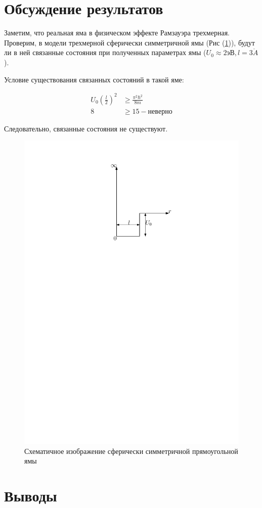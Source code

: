\documentclass[a4paper,12pt]{article}
\begin{document}
\section*{Обсуждение результатов}

Заметим, что реальная яма в физическом эффекте Рамзауэра трехмерная. Проверим, в модели трехмерной сферически симметричной ямы (Рис (\ref{fig4:potential_well_shere})), будут ли в ней связанные состояния при полученных параметрах ямы ($U_0 \approx 2 эВ, l = 3 \mathring{A}$).

Условие существования связанных состояний в такой яме:

\begin{align*}
	U_0 \left( \frac{l}{2} \right)^2 &\geqslant \frac{\pi^2 \hbar^2}{8 m} \\
	8 &\geqslant 15 - неверно
\end{align*}

Следовательно, связанные состояния не существуют.   

\begin{figure}[h!]
	\centering
	\includegraphics[width=0.5\linewidth]{fig6}
	\caption{Схематичное изображение сферически симметричной прямоугольной ямы}
	\label{fig4:potential_well_shere}
\end{figure}

\pagebreak

\section*{Выводы}
\end{document}
